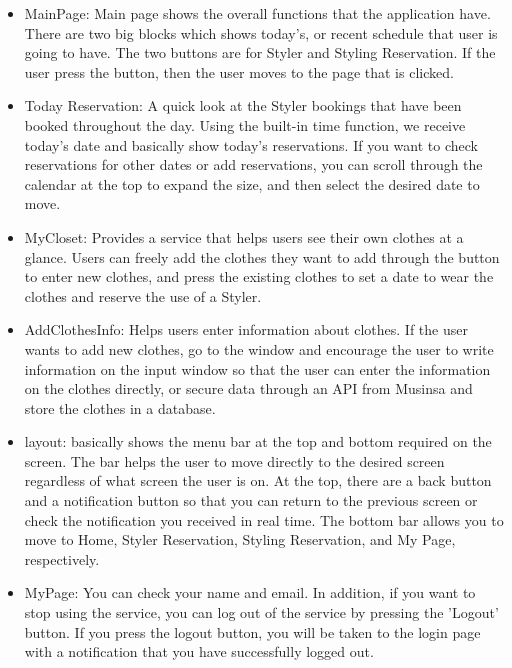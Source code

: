 \documentclass[conference]{IEEEtran}
\begin{document}
\begin{itemize}
    \item MainPage: Main page shows the overall functions that the application have. There are two big blocks which shows today's, or recent schedule that user is going to have. The two buttons are for Styler and Styling Reservation. If the user press the button, then the user moves to the page that is clicked.\\
    
    \item Today Reservation: A quick look at the Styler bookings that have been booked throughout the day. Using the built-in time function, we receive today's date and basically show today's reservations. If you want to check reservations for other dates or add reservations, you can scroll through the calendar at the top to expand the size, and then select the desired date to move.\\
    
    \item MyCloset: Provides a service that helps users see their own clothes at a glance. Users can freely add the clothes they want to add through the button to enter new clothes, and press the existing clothes to set a date to wear the clothes and reserve the use of a Styler.\\
    
    \item AddClothesInfo: Helps users enter information about clothes. If the user wants to add new clothes, go to the window and encourage the user to write information on the input window so that the user can enter the information on the clothes directly, or secure data through an API from Musinsa and store the clothes in a database.\\
    
    \item layout: basically shows the menu bar at the top and bottom required on the screen. The bar helps the user to move directly to the desired screen regardless of what screen the user is on. At the top, there are a back button and a notification button so that you can return to the previous screen or check the notification you received in real time. The bottom bar allows you to move to Home, Styler Reservation, Styling Reservation, and My Page, respectively.\\
    
    \item MyPage: You can check your name and email. In addition, if you want to stop using the service, you can log out of the service by pressing the 'Logout' button. If you press the logout button, you will be taken to the login page with a notification that you have successfully logged out.\\
\end{itemize}
    
\end{document}
